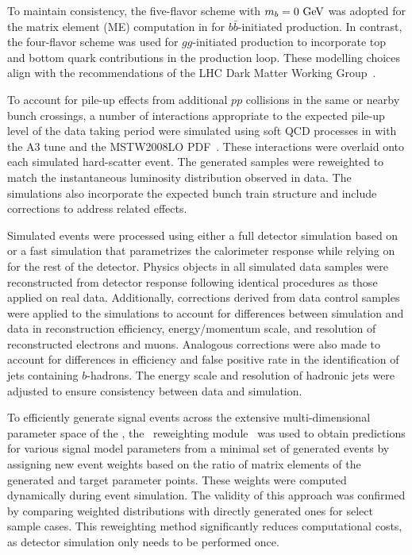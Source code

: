 To maintain consistency, the five-flavor scheme with $m_b = 0~\text{GeV}$ was adopted for the matrix element (ME) computation in \MGNLO for $b\bar{b}$-initiated production. In contrast, the four-flavor scheme was used for $gg$-initiated production to incorporate top and bottom quark contributions in the production loop. These modelling choices align with the recommendations of the LHC Dark Matter Working Group~\cite{2HDMWGproxi}.

To account for pile-up effects from additional $pp$ collisions in the same or nearby bunch crossings, a number of interactions appropriate to the expected pile-up level of the data taking period were simulated using soft QCD processes in  with the A3 tune\cite{ATL-PHYS-PUB-2012-003} and the MSTW2008LO PDF~\cite{Martin:2009iq}. These interactions were overlaid onto each simulated hard-scatter event. The generated samples were reweighted to match the instantaneous luminosity distribution observed in data. The simulations also incorporate the expected bunch train structure and include corrections to address related effects.

Simulated events were processed using either a full detector simulation based on \GEANT~\cite{Agostinelli:2002hh, SOFT-2010-01} or a fast simulation\cite{ATL-PHYS-PUB-2010-013} that parametrizes the calorimeter response while relying on \GEANT for the rest of the detector. Physics objects in all simulated data samples were reconstructed from detector response following identical procedures as those applied on real data. Additionally, corrections derived from data control samples were applied to the simulations to account for differences between simulation and data in reconstruction efficiency, energy/momentum scale, and resolution of reconstructed electrons and muons. Analogous corrections were also made to account for differences in efficiency and false positive rate in the identification of jets containing $b$-hadrons. The energy scale and resolution of hadronic jets were adjusted to ensure consistency between data and simulation.

To efficiently generate signal events across the extensive multi-dimensional parameter space of the \hdma, the \mg~reweighting module~\cite{Mattelaer:2016gcx} was used to obtain predictions for various signal model parameters from a minimal set of generated events by assigning new event weights based on the ratio of matrix elements of the generated and target parameter points. These weights were computed dynamically during event simulation. The validity of this approach was confirmed by comparing weighted distributions with directly generated ones for select sample cases. This reweighting method significantly reduces computational costs, as detector simulation only needs to be performed once.

